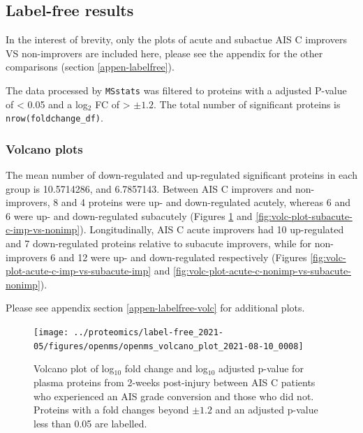 \documentclass[
]{article}
\begin{document}
\clearpage

\hypertarget{chap-4-results}{%
\subsection{Label-free results}\label{chap-4-results}}

In the interest of brevity, only the plots of acute and subactue AIS C improvers VS non-improvers are included here, please see the appendix for the other comparisons (section \ref{appen-labelfree}).

The data processed by \texttt{MSstats} was filtered to proteins with a adjusted P-value of \textless{} 0.05 and a log\(_2\) FC of \textgreater{} \(\pm1.2\).
The total number of significant proteins is \texttt{nrow(foldchange\_df)}.

\hypertarget{volcano-plots}{%
\subsubsection{Volcano plots}\label{volcano-plots}}

The mean number of down-regulated and up-regulated significant proteins in each group is 10.5714286, and 6.7857143.
Between AIS C improvers and non-improvers, 8 and 4 proteins were up- and down-regulated acutely, whereas 6 and 6 were up- and down-regulated subacutely (Figures \ref{fig:volc-plot-c-imp-vs-nonimp} and \ref{fig:volc-plot-subacute-c-imp-vs-nonimp}).
Longitudinally, AIS C acute improvers had 10 up-regulated and 7 down-regulated proteins relative to subacute improvers, while for non-improvers 6 and 12 were up- and down-regulated respectively (Figures \ref{fig:volc-plot-acute-c-imp-vs-subacute-imp} and \ref{fig:volc-plot-acute-c-nonimp-vs-subacute-nonimp}).

Please see appendix section \ref{appen-labelfree-volc} for additional plots.

\clearpage



\begin{figure}
\texttt{[image: ../proteomics/label-free\_2021-05/figures/openms/openms\_volcano\_plot\_2021-08-10\_0008]} \caption{Volcano plot of log\(_10\) fold change and log\(_10\) adjusted p-value for plasma proteins from 2-weeks post-injury between AIS C patients who experienced an AIS grade conversion and those who did not. Proteins with a fold changes beyond \(\pm 1.2\) and an adjusted p-value less than 0.05 are labelled.}\label{fig:volc-plot-c-imp-vs-nonimp}
\end{figure}
\end{document}
